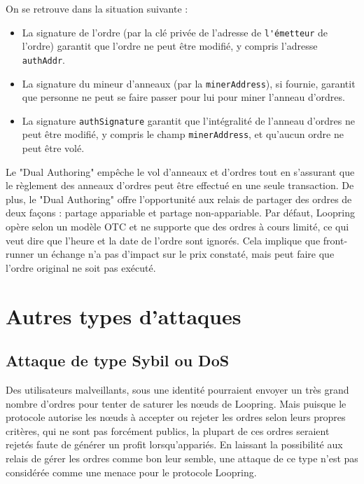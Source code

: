 \documentclass[UTF8,nofonts]{article}
\begin{document}
\begin{multicols}{2}
\begin{enumerate}
\end{enumerate}

On se retrouve dans la situation suivante :

\begin{itemize}

	\item  La signature de l'ordre (par la clé privée de l'adresse de \verb|l'émetteur| de l'ordre) garantit que l'ordre ne peut être modifié, y compris l'adresse \verb|authAddr|.
	\item  La signature du mineur d'anneaux (par la \verb|minerAddress|), si fournie, garantit que personne ne peut se faire passer pour lui pour miner l'anneau d'ordres.
	\item  La signature \verb|authSignature| garantit que l'intégralité de l'anneau d'ordres ne peut être modifié, y compris le champ \verb|minerAddress|, et qu'aucun ordre ne peut être volé.

\end{itemize}

Le "Dual Authoring" empêche le vol d'anneaux et d'ordres tout en s'assurant que le règlement des anneaux d'ordres peut être effectué en une seule transaction. De plus, le "Dual Authoring" offre l'opportunité aux relais de partager des ordres de deux façons : partage appariable et partage non-appariable. Par défaut, Loopring opère selon un modèle OTC et ne supporte que des ordres à cours limité, ce qui veut dire que l'heure et la date de l'ordre sont ignorés. Cela implique que front-runner un échange n'a pas d'impact sur le prix constaté, mais peut faire que l'ordre original ne soit pas exécuté.

\section{Autres types d'attaques}

\subsection{Attaque de type Sybil ou DoS}
Des utilisateurs malveillants, sous une identité  pourraient envoyer un très grand nombre d'ordres pour tenter de saturer les nœuds de Loopring. Mais puisque le protocole autorise les nœuds à accepter ou rejeter les ordres selon leurs propres critères, qui ne sont pas forcément publics, la plupart de ces ordres seraient rejetés faute de générer un profit lorsqu'appariés. En laissant la possibilité aux relais de gérer les ordres comme bon leur semble, une attaque de ce type n'est pas considérée comme une menace pour le protocole Loopring.


\end{multicols}
\end{document}
